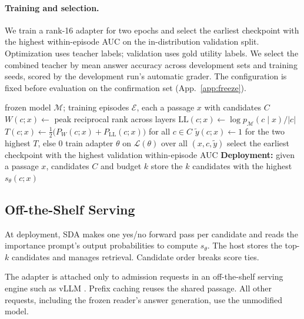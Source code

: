 \paragraph{Training and selection.}
We train a rank-16 adapter for two epochs and select the earliest
checkpoint with the highest within-episode AUC on the in-distribution
validation split. Optimization uses teacher labels; validation uses
gold utility labels. We select the combined teacher by mean answer
accuracy across development sets and training seeds, scored by the
development run's automatic grader. The configuration is fixed before
evaluation on the confirmation set (App.~\ref{app:freeze}).

\begin{algorithm}[t]
\caption{Self-Distilled Admission.}
\label{alg:sda}
\small
\begin{algorithmic}[1]
\Require frozen model $\mathcal M$; training episodes $\mathcal E$, each a passage $x$ with candidates $C$
    \State $W(c;x)\gets$ peak reciprocal rank across layers 
    \State $\mathrm{LL}(c;x)\gets\log p_{\mathcal M}(c\mid x)/|c|$
  \EndFor
  \State $T(c;x)\gets\tfrac12\bigl(P_W(c;x)+P_{\mathrm{LL}}(c;x)\bigr)$ for all $c\in C$ 
  \State $\tilde y(c;x)\gets 1$ for the two highest $T$, else $0$
\EndFor
\State train adapter $\theta$ on $\mathcal L(\theta)$ over all $(x,c,\tilde y)$ 
\State select the earliest checkpoint with the highest validation within-episode AUC
\Statex \textbf{Deployment:} given a passage $x$, candidates $C$ and budget $k$
\State store the $k$ candidates with the highest $s_\theta(c;x)$ 
\end{algorithmic}
\end{algorithm}

\subsection{Off-the-Shelf Serving}
\label{sec:serving}

At deployment, SDA makes one yes/no forward pass per candidate and reads
the importance prompt's output probabilities to compute $s_\theta$.
The host stores the top-$k$ candidates and manages retrieval.
Candidate order breaks score ties.

The adapter is attached only to admission requests in an off-the-shelf
serving engine such as vLLM \citep{kwon2023pagedattention}.
Prefix caching reuses the shared passage. All other requests,
including the frozen reader's answer generation, use the unmodified
model.
